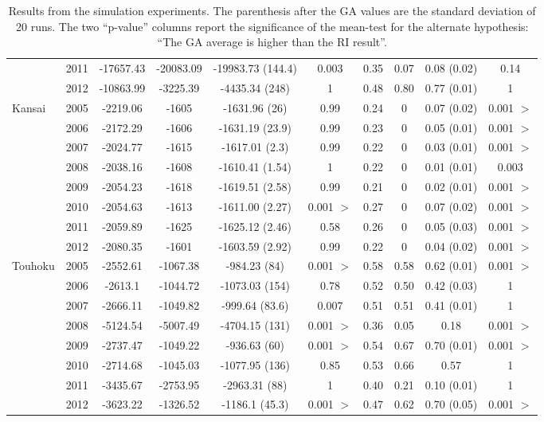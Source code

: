 \documentclass{sig-alternate}
\begin{document}
\begin{table}[t]
\begin{center}
\begin{tabular}{|ll||c|c|c|c||c|c|c|c|}
    & 2011 &-17657.43 &-20083.09    &-19983.73 (144.4) & 0.003 & 0.35 & 0.07 & 0.08 (0.02) & 0.14\\
    & 2012 & -10863.99&-3225.39     &-4435.34 (248) & 1 & 0.48 & 0.80 & 0.77 (0.01) & 1 \\
    \hline
    Kansai & 2005 &-2219.06 &-1605 &-1631.96 (26) & 0.99 & 0.24 & 0 & 0.07 (0.02) & 0.001 $>$\\
    & 2006 & -2172.29&-1606 &-1631.19 (23.9) & 0.99 & 0.23 & 0 & 0.05 (0.01) & 0.001 $>$\\
    & 2007 &-2024.77 &-1615 &-1617.01 (2.3) & 0.99 & 0.22 & 0 & 0.03 (0.01) & 0.001 $>$\\
    & 2008 &-2038.16 &-1608 &-1610.41 (1.54) & 1 & 0.22 & 0 & 0.01 (0.01) & 0.003\\
    & 2009 &-2054.23 &-1618 &-1619.51 (2.58) & 0.99 & 0.21 & 0 & 0.02 (0.01) & 0.001 $>$\\
    & 2010 & -2054.63&-1613 &-1611.00 (2.27) & 0.001 $>$ & 0.27 & 0 & 0.07 (0.02) & 0.001 $>$\\
    & 2011 &-2059.89 &-1625 &-1625.12 (2.46) & 0.58 & 0.26 & 0 & 0.05 (0.03) & 0.001 $>$\\
    & 2012 &-2080.35 &-1601 &-1603.59 (2.92) & 0.99 & 0.22 & 0 & 0.04 (0.02) & 0.001 $>$\\
    \hline
    Touhoku & 2005 &-2552.61 &-1067.38 &-984.23 (84) & 0.001 $>$ & 0.58 & 0.58 & 0.62 (0.01) & 0.001 $>$\\
    & 2006 &-2613.1 &-1044.72 &-1073.03 (154) & 0.78 & 0.52 & 0.50 & 0.42 (0.03) & 1\\
    & 2007 & -2666.11&-1049.82 &-999.64 (83.6) & 0.007 & 0.51 & 0.51 & 0.41 (0.01) & 1\\
    & 2008 & -5124.54&-5007.49 &-4704.15 (131) & 0.001 $>$ & 0.36 & 0.05 & 0.18 & 0.001 $>$\\
    & 2009 & -2737.47&-1049.22 &-936.63 (60) & 0.001 $>$ & 0.54 & 0.67 & 0.70 (0.01) & 0.001 $>$\\
    & 2010 & -2714.68&-1045.03 &-1077.95 (136) & 0.85 & 0.53 & 0.66 & 0.57 & 1\\
    & 2011 & -3435.67&-2753.95 &-2963.31 (88) & 1 & 0.40 & 0.21 & 0.10 (0.01) & 1\\
    & 2012 &-3623.22 &-1326.52 &-1186.1 (45.3) & 0.001 $>$ & 0.47 & 0.62 & 0.70 (0.05) & 0.001 $>$\\
    \hline
  \end{tabular}
  \end{center}
  \caption{Results from the simulation experiments. The parenthesis
    after the GA values are the standard deviation of 20 runs. The two
    ``p-value'' columns report the significance of the mean-test for
    the alternate hypothesis: ``The GA average is higher than the RI
    result''.}
  \label{bigtable}
\end{table}
\end{document}
